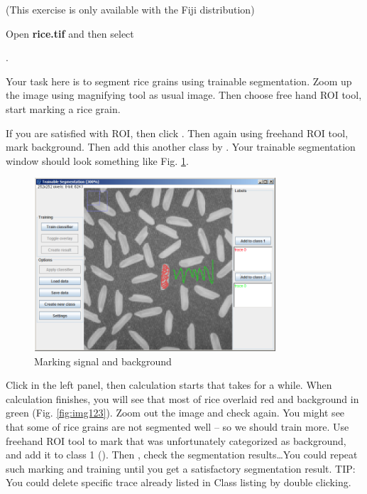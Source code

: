 \begin{indentexercise}{1}
(This exercise is only available with the Fiji distribution)

Open \textbf{rice.tif} and then select 

. 

Your task here is to segment rice grains using trainable segmentation. Zoom up the image
using magnifying tool as usual image. Then choose free hand ROI tool,
start marking a rice grain. 

If you are satisfied with ROI, then click
. Then
again using freehand ROI tool, mark background. Then add this another
class by . Your trainable segmentation window should look
something like Fig. \ref{fig:img122}. 

\begin{figure}[htbp]
\begin{center}
\includegraphics[width=9.001cm,height=6.447cm]{fig/CMCIBasicCourse201102-img122.png}
\caption{ Marking signal and background}
\label{fig:img122}
\end{center}
\end{figure}

Click  in the left panel, then calculation starts that takes for a while. When
calculation finishes, you will see that most of rice overlaid red and background in green (Fig. \ref{fig:img123}). Zoom out the image and check again. You might see that some of rice grains are not segmented well -- so we should train more. Use freehand ROI tool to mark that was unfortunately categorized
as background, and add it to class 1 (). Then , check the segmentation results\ldots You
could repeat such marking and training until you get a satisfactory
segmentation result. TIP: You could delete specific trace already
listed in Class listing by double clicking.


\end{indentexercise}
